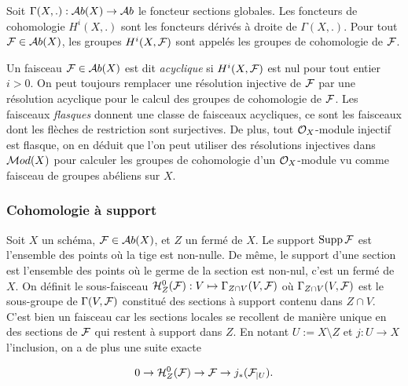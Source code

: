 \begin{defn}
Soit $\Gamma(X,.):\mathcal{A} b(X)\rightarrow \mathcal{A} b$ le foncteur sections globales. Les foncteurs de cohomologie $H^i(X,.)$ sont les foncteurs dérivés à droite de $\Gamma(X,.)$. Pour tout $\mathcal{F}\in \mathcal{A} b(X)$, les groupes $H^i(X,\mathcal{F})$ sont appelés les groupes de cohomologie de $\mathcal{F}$.
\end{defn}


Un faisceau $\mathcal{F}\in \mathcal{A} b(X)$ est dit \textit{acyclique} si $H^i(X,\mathcal{F})$ est nul pour tout entier $i>0$. On peut toujours remplacer une résolution injective de $\mathcal{F}$ par une résolution acyclique pour le calcul des groupes de cohomologie de $\mathcal{F}$. Les faisceaux \textit{flasques} donnent une classe de faisceaux acycliques, ce sont les faisceaux dont les flèches de restriction sont surjectives. De plus, tout $\mathcal{O}_X$-module injectif est flasque, on en déduit que l'on peut utiliser des résolutions injectives dans $\mathcal{M} od(X)$ pour calculer les groupes de cohomologie d'un $\mathcal{O}_X$-module vu comme faisceau de groupes abéliens sur $X$.

\subsubsection{Cohomologie à support}

Soit $X$ un schéma, $\mathcal{F}\in \mathcal{A} b(X)$, et $Z$ un fermé de $X$. Le support $\operatorname{Supp}\mathcal{F}$ est l'ensemble des points où la tige est non-nulle. De même, le support d'une section est l'ensemble des points où le germe de la section est non-nul, c'est un fermé de $X$. On définit le sous-faisceau $\mathcal{H} ^0 _Z(\mathcal{F}):V\mapsto \Gamma_{Z\cap V}(V,\mathcal{F})$ où $\Gamma_{Z\cap V}(V,\mathcal{F})$ est le sous-groupe de $\Gamma(V,\mathcal{F})$ constitué des sections à support contenu dans $Z\cap V$. C'est bien un faisceau car les sections locales se recollent de manière unique en des sections de $\mathcal{F}$ qui restent à support dans $Z$. En notant $U:=X\setminus Z$ et $j:U\rightarrow X$ l'inclusion, on a de plus une suite exacte

\begin{equation}\label{eq:ESSupport}
0\rightarrow \mathcal{H}^0 _Z(\mathcal{F}) \rightarrow \mathcal{F} \rightarrow j_*(\mathcal{F}_{|U}).
\end{equation}

